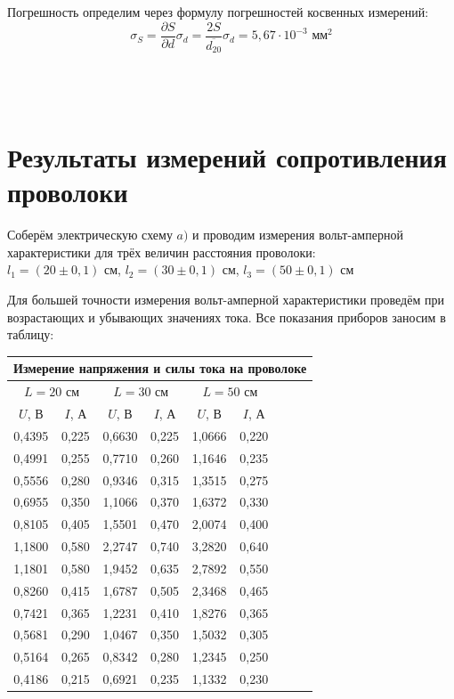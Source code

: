 Погрешность определим через формулу погрешностей косвенных измерений:
\[\sigma_S = \frac{\partial{S}}{\partial{d}}\sigma_d = \frac{2S}{\overline{d_{20}}}\sigma_d = 5,67\cdot 10^{-3}\text{ мм}^{2}\]\\\\\\

\section{Результаты измерений сопротивления проволоки}

Соберём электрическую схему $a)$ и проводим измерения вольт-амперной характеристики для трёх величин расстояния проволоки:\\ $l_1=(20\pm 0,1)$ см, $l_2=(30\pm 0,1)$ см, $l_3=(50\pm 0,1)$ см

Для большей точности измерения вольт-амперной характеристики проведём при возрастающих и убывающих значениях тока. Все показания приборов заносим в таблицу:
\begin{center}
\begin{tabular}{|c|c|c|c|c|c|c|c|c|}
\hline
\multicolumn{9}{|c|}{Измерение напряжения и силы тока на проволоке}                                                                                \\ \hline
\multicolumn{2}{|c|}{$L = 20$ см} & \multicolumn{2}{c|}{$L = 30$ см} & \multicolumn{2}{c|}{$L = 50$ см}                         \\ \hline
$U$, В & $I$, А & $U$, В & $I$, А & $U$, В & $I$, А \\ \hline
0,4395&0,225&0,6630&0,225&1,0666&0,220 \\ \hline  
0,4991&0,255&0,7710&0,260&1,1646&0,235 \\ \hline
0,5556&0,280&0,9346&0,315&1,3515&0,275 \\ \hline
0,6955&0,350&1,1066&0,370&1,6372&0,330 \\ \hline
0,8105&0,405&1,5501&0,470&2,0074&0,400 \\ \hline
1,1800&0,580&2,2747&0,740&3,2820&0,640 \\ \hline
1,1801&0,580&1,9452&0,635&2,7892&0,550  \\ \hline
0,8260&0,415&1,6787&0,505&2,3468&0,465 \\ \hline
0,7421&0,365&1,2231&0,410&1,8276&0,365 \\ \hline
0,5681&0,290&1,0467&0,350&1,5032&0,305 \\ \hline
0,5164&0,265&0,8342&0,280&1,2345&0,250 \\ \hline
0,4186&0,215&0,6921&0,235&1,1332&0,230 \\ \hline
\end{tabular}
\end{center}

